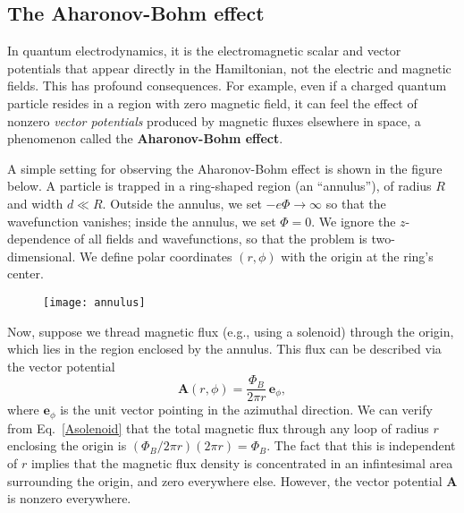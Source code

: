 \documentclass[pra,12pt]{revtex4}
\begin{document}
\subsection{The Aharonov-Bohm effect}

In quantum electrodynamics, it is the electromagnetic scalar and
vector potentials that appear directly in the Hamiltonian, not the
electric and magnetic fields.  This has profound consequences.  For
example, even if a charged quantum particle resides in a region with
zero magnetic field, it can feel the effect of nonzero \textit{vector
  potentials} produced by magnetic fluxes elsewhere in space, a
phenomenon called the \textbf{Aharonov-Bohm effect}.

A simple setting for observing the Aharonov-Bohm effect is shown in
the figure below.  A particle is trapped in a ring-shaped region (an
``annulus''), of radius $R$ and width $d \ll R$.  Outside the annulus,
we set $-e\Phi\rightarrow\infty$ so that the wavefunction vanishes;
inside the annulus, we set $\Phi = 0$.  We ignore the $z$-dependence
of all fields and wavefunctions, so that the problem is
two-dimensional.  We define polar coordinates $(r,\phi)$ with the
origin at the ring's center.

\begin{figure}[h]
  \centering\texttt{[image: annulus]}
\end{figure}

Now, suppose we thread magnetic flux (e.g., using a solenoid) through
the origin, which lies in the region enclosed by the annulus.  This
flux can be described via the vector potential
\begin{equation}
  \mathbf{A}(r,\phi) = \frac{\Phi_B}{2\pi r} \, \mathbf{e}_\phi,
  \label{Asolenoid}
\end{equation}
where $\mathbf{e}_\phi$ is the unit vector pointing in the azimuthal
direction.  We can verify from Eq.~\eqref{Asolenoid} that the total
magnetic flux through any loop of radius $r$ enclosing the origin is
$(\Phi_B/2\pi r)(2\pi r) = \Phi_B$.  The fact that this is independent
of $r$ implies that the magnetic flux density is concentrated in an
infintesimal area surrounding the origin, and zero everywhere
else. However, the vector potential $\mathbf{A}$ is nonzero
everywhere.
\end{document}
